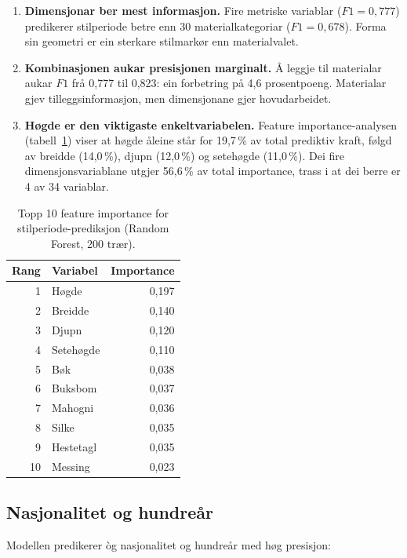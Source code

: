 \documentclass[10pt, a4paper, twocolumn]{article}
\begin{document}
\begin{enumerate}
  \item \textbf{Dimensjonar ber mest informasjon.} Fire metriske variablar ($F1 = 0{,}777$) predikerer stilperiode betre enn 30 materialkategoriar ($F1 = 0{,}678$). Forma sin geometri er ein sterkare stilmarkør enn materialvalet.

  \item \textbf{Kombinasjonen aukar presisjonen marginalt.} Å leggje til materialar aukar $F1$ frå 0,777 til 0,823: ein forbetring på 4,6 prosentpoeng. Materialar gjev tilleggsinformasjon, men dimensjonane gjer hovudarbeidet.

  \item \textbf{Høgde er den viktigaste enkeltvariabelen.} Feature importance-analysen (tabell~\ref{tab:importance}) viser at høgde åleine står for 19,7\,\% av total prediktiv kraft, følgd av breidde (14,0\,\%), djupn (12,0\,\%) og setehøgde (11,0\,\%). Dei fire dimensjonsvariablane utgjer 56,6\,\% av total importance, trass i at dei berre er 4 av 34 variablar.
\end{enumerate}

\begin{table}[H]
\centering
\caption{Topp 10 feature importance for stilperiode-prediksjon (Random Forest, 200 trær).}
\label{tab:importance}
\begin{tabular}{@{}rlr@{}}
\toprule
\textbf{Rang} & \textbf{Variabel} & \textbf{Importance} \\
\midrule
1 & Høgde & 0,197 \\
2 & Breidde & 0,140 \\
3 & Djupn & 0,120 \\
4 & Setehøgde & 0,110 \\
5 & Bøk & 0,038 \\
6 & Buksbom & 0,037 \\
7 & Mahogni & 0,036 \\
8 & Silke & 0,035 \\
9 & Hestetagl & 0,035 \\
10 & Messing & 0,023 \\
\bottomrule
\end{tabular}
\end{table}


\subsection{Nasjonalitet og hundreår}

Modellen predikerer òg nasjonalitet og hundreår med høg presisjon:
\end{document}

